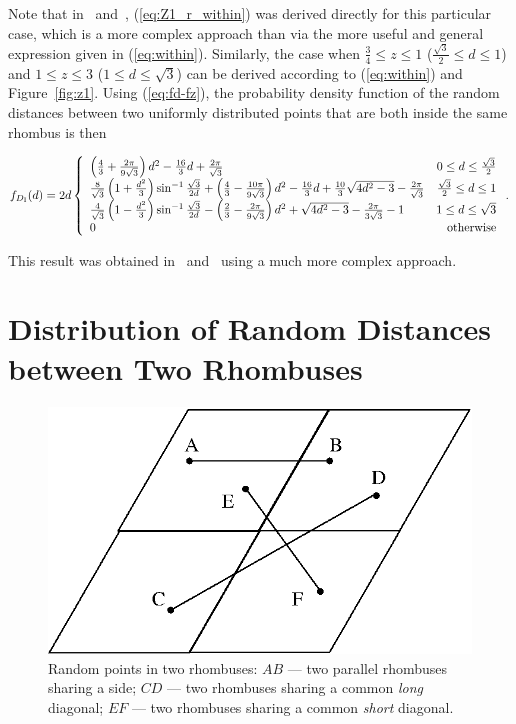 \documentclass[12pt,draftclsnofoot,onecolumn]{IEEEtran}
\begin{document}
Note that in~\cite{zhuang2011random}
and~\cite{zhuang2012geometrical}, (\ref{eq:Z1_r_within}) was derived directly
for this particular case, which is a more complex approach than via the
more useful and general expression given in (\ref{eq:within}). 
Similarly, the case when $\frac{3}{4} \leq z \leq 1$ ($\frac{\sqrt{3}}{2}\leq 
d\leq 1$) and $1 \leq z \leq 3$ ($1\leq d\leq \sqrt{3}$) can
be derived according to (\ref{eq:within}) and Figure~\ref{fig:z1}. Using (\ref{eq:fd-fz}), the
probability density function of the random distances between two uniformly
distributed points that are both inside the same rhombus is then
\begin{small}
 \begin{equation}\label{eq:fd_r_within}
  f_{D_{\rm I}}(d)=2d\left\{
    \begin{array}{lr}

\left(\frac{4}{3}+\frac{2\pi}{9\sqrt{3}}\right)d^2-\frac{16}{3}d+\frac{2\pi}{
\sqrt{3}} & 0\leq d\leq \frac{\sqrt{3}}{2}\\

\frac{8}{\sqrt{3}}\left(1+\frac{d^2}{3}\right)\sin^{-1}\frac{\sqrt{3}}{2d}
+\left(\frac{4}{3}-\frac{10\pi}{9\sqrt{3}}\right)d^2-\frac{16}{3}d+\frac{10}{3}
\sqrt{4d^2-3}-\frac{2\pi}{\sqrt{3}} & \frac{\sqrt{3}}{2}\leq d\leq 1\\

\frac{4}{\sqrt{3}}\left(1-\frac{d^2}{3}\right)\sin^{-1}\frac{\sqrt{3}}{2d}
-\left(\frac{2}{3}-\frac{2\pi}{9\sqrt{3}}\right)d^2+\sqrt{4d^2-3}-\frac{2\pi}{
3\sqrt{3}}-1 & 1\leq d\leq \sqrt{3} \\

      0 & {\rm otherwise}
    \end{array}
  \right..
\end{equation}
\end{small}
This result was obtained in~\cite{zhuang2011random} and~\cite{zhuang2012geometrical} using
a much more complex approach.

\section{Distribution of Random Distances between Two Rhombuses}\label{sec-betweenr}

\begin{figure}
  \centering
  \includegraphics[width=0.4\columnwidth]{fig/rhombus}
  \caption{Random points in two rhombuses: $AB$ --- two parallel rhombuses
  sharing a side; $CD$ --- two rhombuses sharing a common \textit{long} 
  diagonal; $EF$ --- two rhombuses sharing a common \textit{short} diagonal.}
  \label{fig:two}
\end{figure}
\end{document}
